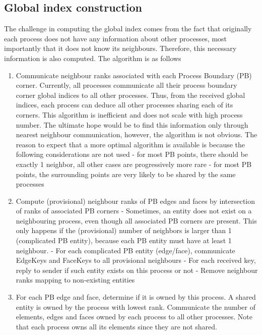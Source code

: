 \subsection{Global index construction}
\label{impl-grid-constructor-globalindex}

\noindent
The challenge in computing the global index comes from the fact that originally each process does not have any information about other processes, most importantly that it does not know its neighbours. Therefore, this necessary information is also computed. The algorithm is as follows

\begin{enumerate}
	\item Communicate neighbour ranks associated with each Process Boundary (PB) corner. Currently, all processes communicate all their process boundary corner global indices to all other processes. Thus, from the received global indices, each process can deduce all other processes sharing each of its corners. This algorithm is inefficient and does not scale with high process number. The ultimate hope would be to find this information only through nearest neighbour communication, however, the algorithm is not obvious. The reason to expect that a more optimal algorithm is available is because the following considerations are not used
	  \subitem - for most PB points, there should be exactly 1 neighbor, all other cases are progressively more rare
	  \subitem - for most PB points, the surrounding points are very likely to be shared by the same processes
	\item Compute (provisional) neighbour ranks of PB edges and faces by intersection of ranks of associated PB corners
      \subitem - Sometimes, an entity does not exist on a neighbouring process, even though all associated PB corners are present. This only happens if the (provisional) number of neighbors is larger than 1 (complicated PB entity), because each PB entity must have at least 1 neighbour.
       \subitem - For each complicated PB entity (edge/face), communicate EdgeKeys and FaceKeys to all provisional neighbours
       \subitem - For each received key, reply to sender if such entity exists on this process or not
       \subitem - Remove neighbour ranks mapping to non-existing entities
    \item For each PB edge and face, determine if it is owned by this process. A shared entity is owned by the process with lowest rank. Communicate the number of elements, edges and faces owned by each process to all other processes. Note that each process owns all its elements since they are not shared.

\end{enumerate}
